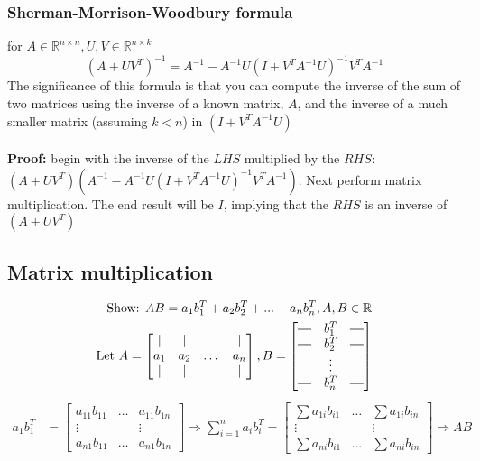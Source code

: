 \documentclass{article}
\newcommand*{\horzbar}{\rule[.5ex]{2.5ex}{0.5pt}}
\begin{document}
\subsubsection{Sherman-Morrison-Woodbury formula} 
for $A\in \mathbb{R}^{n\times n}, U,V \in \mathbb{R}^{n\times k}$
\begin{equation*}
    (A+UV^T)^{-1} = A^{-1} - A^{-1}U(I+V^TA^{-1}U)^{-1}V^TA^{-1} 
\end{equation*}
The significance of this formula is that you can compute the inverse of the sum of two matrices using the inverse of a known matrix, $A$, and the inverse of a much smaller matrix (assuming $k<n$) in $(I + V^TA^{-1}U)$\\ \\
\textbf{Proof:} begin with the inverse of the $LHS$ multiplied by the $RHS$: $(A+UV^T) (A^{-1} - A^{-1}U(I+V^TA^{-1}U)^{-1}V^TA^{-1})$. Next perform matrix multiplication. The end result will be $I$, implying that the $RHS$ is an inverse of $(A+UV^T)$


\subsection{Matrix multiplication}
\begin{align*}
\textrm{Show: } AB = a_1b_1^T + a_2b_2^T + ... + a_nb_n^T, A,B \in \mathbb{R} \\
   \textrm{Let }
   A = \begin{bmatrix}
        \vert & \vert& & \vert \\
        a_1 & a_2 & \dots & a_n   \\
        \vert & \vert & & \vert \end{bmatrix}, 
    B = \begin{bmatrix}
        \horzbar & b_1^T & \horzbar \\
        \horzbar & b_2^T & \horzbar \\
         & \vdots &  \\ 
        \horzbar & b_n^T & \horzbar
    \end{bmatrix}
\end{align*}
\begin{align*}
    a_1b_1^T &= \begin{bmatrix}
        a_{11}b_{11} & \dots & a_{11}b_{1n} \\
        \vdots &  & \vdots \\
        a_{n1}b_{11} & \dots & a_{n1}b_{1n}
    \end{bmatrix} \Rightarrow
    \sum_{i=1}^{n} a_ib_i^T = \begin{bmatrix}
        \sum a_{1i}b_{i1} & \dots & \sum a_{1i}b_{in} \\
        \vdots &   & \vdots \\
        \sum a_{ni}b_{i1} &  \dots & \sum a_{ni}b_{in}
    \end{bmatrix} \Rightarrow AB
\end{align*}
\end{document}
